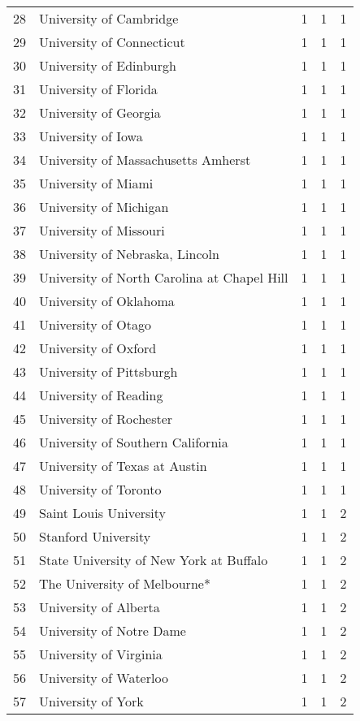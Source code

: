 \begin{longtable}{rllll}
  28 & University of Cambridge & 1 & 1 & 1 \\ 
  29 & University of Connecticut & 1 & 1 & 1 \\ 
  30 & University of Edinburgh & 1 & 1 & 1 \\ 
  31 & University of Florida & 1 & 1 & 1 \\ 
  32 & University of Georgia & 1 & 1 & 1 \\ 
  33 & University of Iowa & 1 & 1 & 1 \\ 
  34 & University of Massachusetts Amherst & 1 & 1 & 1 \\ 
  35 & University of Miami & 1 & 1 & 1 \\ 
  36 & University of Michigan & 1 & 1 & 1 \\ 
  37 & University of Missouri & 1 & 1 & 1 \\ 
  38 & University of Nebraska, Lincoln & 1 & 1 & 1 \\ 
  39 & University of North Carolina at Chapel Hill & 1 & 1 & 1 \\ 
  40 & University of Oklahoma & 1 & 1 & 1 \\ 
  41 & University of Otago & 1 & 1 & 1 \\ 
  42 & University of Oxford & 1 & 1 & 1 \\ 
  43 & University of Pittsburgh & 1 & 1 & 1 \\ 
  44 & University of Reading & 1 & 1 & 1 \\ 
  45 & University of Rochester & 1 & 1 & 1 \\ 
  46 & University of Southern California & 1 & 1 & 1 \\ 
  47 & University of Texas at Austin & 1 & 1 & 1 \\ 
  48 & University of Toronto & 1 & 1 & 1 \\ 
  49 & Saint Louis University & 1 & 1 & 2 \\ 
  50 & Stanford University & 1 & 1 & 2 \\ 
  51 & State University of New York at Buffalo & 1 & 1 & 2 \\ 
  52 & The University of Melbourne* & 1 & 1 & 2 \\ 
  53 & University of Alberta & 1 & 1 & 2 \\ 
  54 & University of Notre Dame & 1 & 1 & 2 \\ 
  55 & University of Virginia & 1 & 1 & 2 \\ 
  56 & University of Waterloo & 1 & 1 & 2 \\ 
  57 & University of York & 1 & 1 & 2 \\ 

\end{longtable}

